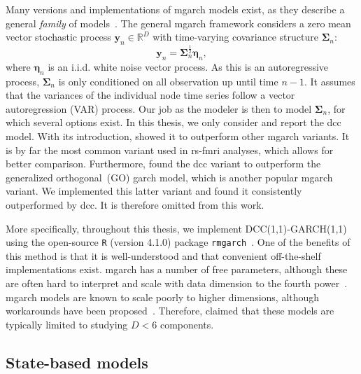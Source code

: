 Many versions and implementations of \gls{mgarch} models exist, as they describe a general \emph{family} of models~\parencite[see][for an extensive overview]{Silvennoinen2009}.
%
The general \gls{mgarch} framework considers a zero mean vector stochastic process $\mathbf{y}_n \in \mathbb{R}^D$ with time-varying covariance structure $\mathbf{\Sigma}_n$:
\begin{equation}
  \mathbf{y}_n = \mathbf{\Sigma}_n^{\frac12} \mathbf{\eta}_n,
\end{equation}
where $\mathbf{\eta}_n$ is an i.i.d. white noise vector process.
As this is an autoregressive process, $\mathbf{\Sigma}_n$ is only conditioned on all observation up until time $n - 1$.
It assumes that the variances of the individual node time series follow a vector autoregression (VAR) process.
%
Our job as the modeler is then to model $\mathbf{\Sigma}_n$, for which several options exist.
In this thesis, we only consider and report the \gls{dcc} model.
With its introduction, \textcite{Engle2002} showed it to outperform other \gls{mgarch} variants.
It is by far the most common variant used in \gls{rs-fmri} analyses, which allows for better comparison.
Furthermore, \textcite{Heaukulani2019} found the \gls{dcc} variant to outperform the generalized orthogonal~(GO) \gls{garch} model, which is another popular \gls{mgarch} variant.
We implemented this latter variant and found it consistently outperformed by \gls{dcc}.
It is therefore omitted from this work.

More specifically, throughout this thesis, we implement DCC(1,1)-GARCH(1,1) using the open-source \texttt{R} (version 4.1.0) package \texttt{rmgarch}~\parencite{Galanos2022}.
One of the benefits of this method is that it is well-understood and that convenient off-the-shelf implementations exist.
\Gls{mgarch} has a number of free parameters, although these are often hard to interpret and scale with data dimension to the fourth power~\parencite{Silvennoinen2009}.
\Gls{mgarch} models are known to scale poorly to higher dimensions, although workarounds have been proposed~\parencite[see e.g.][]{Nakajima2017}.
Therefore, \textcite{Gourieroux2009} claimed that these models are typically limited to studying $D < 6$ components.

\subsection{State-based models}
\label{subsec:state-based-models}

